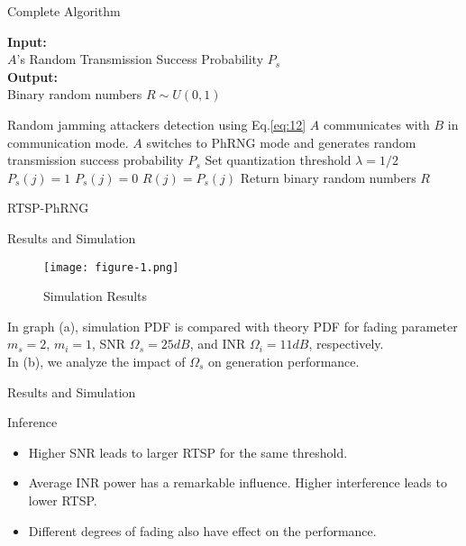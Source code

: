 \documentclass{beamer}
\providecommand{\brak}[1]{\ensuremath{\left(#1\right)}}
\providecommand{\Mod}[1]{\ensuremath{\left\lvert#1\right\rvert}}
\begin{document}
\begin{frame}{Complete Algorithm}
\begin{algorithm}[H]
\scriptsize
\hspace*{\algorithmicindent} \textbf{Input:} \\
    \hspace*{\algorithmicindent} $A$'s Random Transmission Success Probability $P_{s}$\\
    \hspace*{\algorithmicindent} \textbf{Output:} \\
    \hspace*{\algorithmicindent} Binary random numbers $R\sim U\brak{0,1}$
\begin{algorithmic}[1]
\STATE Random jamming attackers detection using Eq.\eqref{eq:12}
    \STATE $A$ communicates with $B$ in communication mode.
\ELSE
    \STATE $A$ switches to PhRNG mode and generates random transmission success probability $P_{s}$
    \STATE Set quantization threshold $\lambda=1/2$
    \FOR{$j\longleftarrow1$ to length $\Mod{P_{s}}$}
        \IF{$P_{s}\brak{j}\geq \lambda$}
            \STATE $P_{s}\brak{j}=1$
        \ELSE
            \STATE $P_{s}\brak{j}=0$
        \ENDIF
        \STATE $R\brak{j}=P_{s}\brak{j}$
    \ENDFOR
    \STATE Return binary random numbers $R$
\ENDIF
\end{algorithmic}
\caption{RTSP-PhRNG}
\end{algorithm}
\end{frame}
\begin{frame}{Results and Simulation}
    \begin{figure}[!htb]
        \centering
        \texttt{[image: figure-1.png]}
        \caption{Simulation Results}
        \label{fig:simulation}
    \end{figure}
In graph (a), simulation PDF is compared with theory PDF for fading parameter $m_{s}=2$, $m_{i}=1$, SNR $\Omega_{s}=25dB$, and INR $\Omega_{i}=11dB$, respectively. \\
In (b), we analyze the impact of $\Omega_{s}$ on generation performance.
\end{frame}
\begin{frame}{Results and Simulation}
    \begin{block}{Inference}
        \begin{itemize}
            \item Higher SNR leads to larger RTSP for the same threshold.
            \item Average INR power has a remarkable influence. Higher interference leads to lower RTSP.
            \item Different degrees of fading also have effect on the performance. 
        \end{itemize}
    \end{block}
\end{frame}
\end{document}
